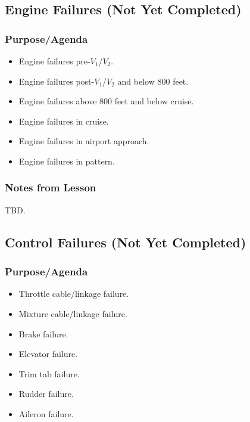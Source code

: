 \documentclass[letterpaper,10pt,titlepage]{article}
\begin{document}
\subsection{Engine Failures (Not Yet Completed)}
\label{sfle0:sefa0}



\subsubsection{Purpose/Agenda}
\label{sfle0:sefa0:spov0}

\begin{itemize}
\item Engine failures pre-$V_1$/$V_2$.
\item Engine failures post-$V_1$/$V_2$ and below 800 feet.
\item Engine failures above 800 feet and below cruise.
\item Engine failures in cruise.
\item Engine failures in airport approach.
\item Engine failures in pattern.
\end{itemize}


\subsubsection{Notes from Lesson}
\label{sfle0:sefa0:snff0}

TBD.


\subsection{Control Failures (Not Yet Completed)}
\label{sfle0:scfa0}



\subsubsection{Purpose/Agenda}
\label{sfle0:scfa0:spov0}

\begin{itemize}
\item Throttle cable/linkage failure.
\item Mixture cable/linkage failure.
\item Brake failure.
\item Elevator failure.
\item Trim tab failure.
\item Rudder failure.
\item Aileron failure.
\end{itemize}
\end{document}
